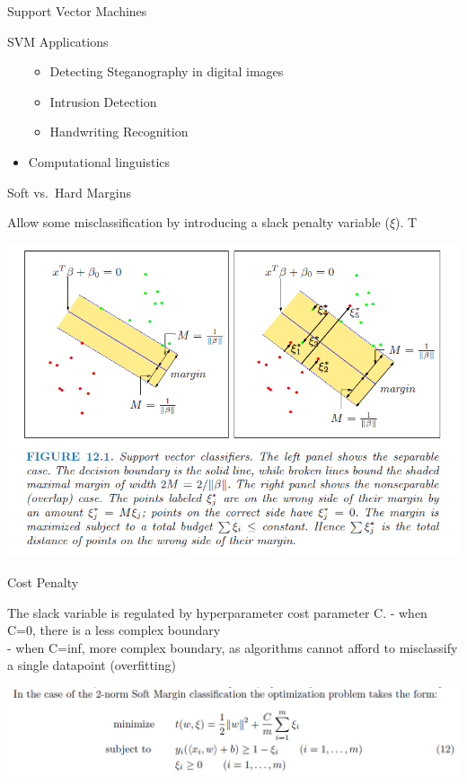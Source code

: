 \documentclass[ignorenonframetext,]{beamer}
\providecommand{\tightlist}{%
  \setlength{\itemsep}{0pt}\setlength{\parskip}{0pt}}
\begin{document}
\begin{frame}[fragile]{Support Vector Machines}
\begin{block}{SVM Applications}
\begin{itemize}
  \begin{itemize}
  \tightlist
  \item
    Detecting Steganography in digital images
  \item
    Intrusion Detection
  \item
    Handwriting Recognition
  \end{itemize}
\item
  Computational linguistics
\end{itemize}

\end{block}

\begin{block}{Soft vs.~Hard Margins}

Allow some misclassification by introducing a slack penalty variable
(\(\xi\)). T

\includegraphics[width=600px]{svm5}

\end{block}

\begin{block}{Cost Penalty}

The slack variable is regulated by hyperparameter cost parameter C. -
when C=0, there is a less complex boundary\\
- when C=inf, more complex boundary, as algorithms cannot afford to
misclassify a single datapoint (overfitting)

\includegraphics[width=800px]{svm6}


\end{block}
\end{frame}
\end{document}
